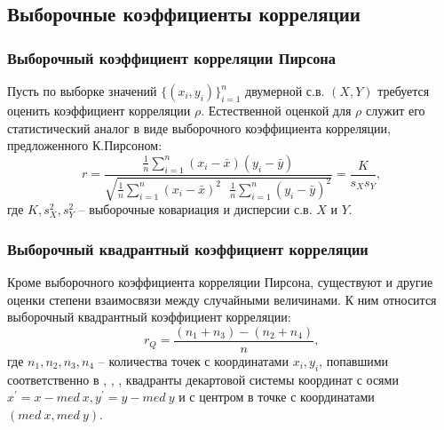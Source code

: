 \documentclass[main.tex]{subfiles}
\begin{document}
\subsection{Выборочные коэффициенты корреляции}

\subsubsection{Выборочный коэффициент корреляции Пирсона}
Пусть по выборке значений $\{(x_{i},y_{i})\}_{i=1}^{n}$ двумерной с.в. $(X, Y)$ требуется оценить коэффициент корреляции $\rho$. Естественной оценкой для $\rho$ служит его статистический аналог в виде выборочного коэффициента корреляции, предложенного К.Пирсоном:
\begin{equation}
	r = \dfrac{\frac{1}{n} \sum_{i=1}^{n} (x_i - \bar{x})(y_i - \bar{y})}{\sqrt{\frac{1}{n} \sum_{i=1}^{n} (x_i - \bar{x})^2 \text{ } \frac{1}{n} \sum_{i=1}^{n} (y_i - \bar{y})^2}} = \dfrac{K}{s_X s_Y} \text{,}
\end{equation}
где $K, s_{X}^2, s_{Y}^2$ -- выборочные ковариация и дисперсии с.в. $X \text{ и } Y$.

\subsubsection{Выборочный квадрантный коэффициент корреляции}
Кроме выборочного коэффициента корреляции Пирсона, существуют и другие оценки степени взаимосвязи между случайными величинами. К ним относится выборочный квадрантный коэффициент корреляции:
\begin{equation}
	r_Q = \dfrac{(n_1 + n_3) - (n_2 + n_4)}{n} \text{,}
\end{equation}
где $n_1, n_2, n_3, n_4$ -- количества точек с координатами $x_i, y_i$, попавшими соответственно в , , ,  квадранты декартовой системы координат с осями $x^\prime = x - med \ x, y^\prime = y - med \ y$ и с центром в точке с координатами $(med \ x, med \ y)$.
\end{document}
